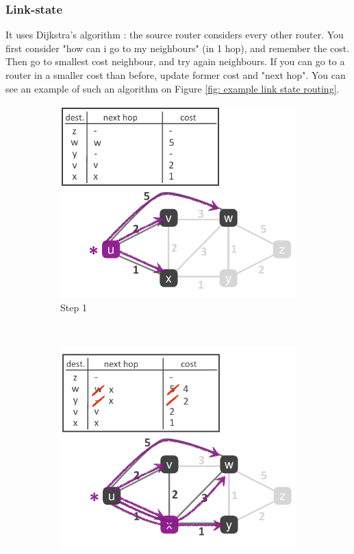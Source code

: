 \documentclass[12pt,a4paper]{article}
\begin{document}
\subsubsection{Link-state}
It uses Dijkstra's algorithm : the source router considers every other router. You first consider "how can i go to my neighbours" (in 1 hop), and remember the cost. Then go to smallest cost neighbour, and try again neighbours. If you can go to a router in a smaller cost than before, update former cost and "next hop". You can see an example of such an algorithm on Figure \ref{fig: example link state routing}. 
\begin{figure}[h]
	\centering
	\begin{subfigure}[t]{0.3\textwidth}
		\centering
		\includegraphics[scale=0.4]{images/dijkstra1}
		\caption{Step 1}
		\label{subf: step1}
	\end{subfigure}
	~
	\begin{subfigure}[t]{0.3\textwidth}
		\centering
		\includegraphics[scale=0.4]{images/dijkstra2}

\end{subfigure}
\end{figure}
\end{document}
